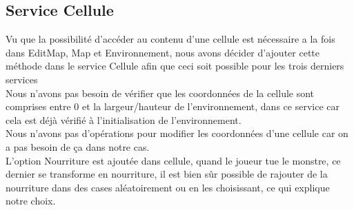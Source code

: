 \documentclass{article}
\begin{document}
\subsection{Service Cellule}
Vu que la possibilité d’accéder au contenu d’une cellule est nécessaire a la fois dans EditMap, Map et Environnement, nous avons décider d’ajouter cette méthode dans le service Cellule afin que ceci soit possible pour les trois derniers services 
\\
Nous n'avons pas besoin de vérifier que les coordonnées de la cellule sont comprises entre 0 et la largeur/hauteur de l'environnement, dans ce service car cela est déjà vérifié à l'initialisation de l'environnement.
\\
Nous n'avons pas d'opérations pour modifier les coordonnées d'une cellule car on a pas besoin de ça dans notre cas.
\\ 
L'option Nourriture est ajoutée dans cellule, quand le joueur tue le monstre, ce dernier se transforme en nourriture, il est bien sûr possible de rajouter de la nourriture dans des cases aléatoirement ou en les choisissant, ce qui explique notre choix.
\end{document}
